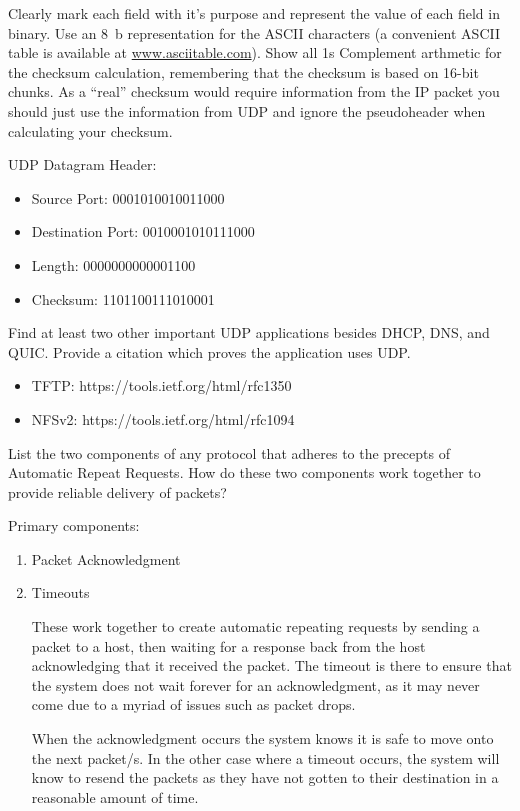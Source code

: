 \documentclass[12pt,addpoints,answers]{exam}
\begin{document}
\begin{questions}
Clearly mark each field with it's purpose and represent the value of each field in binary. Use an \SI{8}{b} representation for the ASCII characters (a convenient ASCII table is available at \url{www.asciitable.com}). Show all 1s Complement arthmetic for the checksum calculation, remembering that the checksum is based on 16-bit chunks. As a ``real'' checksum would require information from the IP packet you should just use the information from UDP and ignore the pseudoheader when calculating your checksum.
\begin{solution}
	UDP Datagram Header:
	\begin{itemize}
		\item Source Port: 0001010010011000
		\item Destination Port: 0010001010111000
		\item Length: 0000000000001100
		\item Checksum: 1101100111010001
	\end{itemize}
\end{solution}

\question[4] Find at least two other important UDP applications besides DHCP, DNS, and QUIC. Provide a citation which proves the application uses UDP.
\begin{solution}
	\begin{itemize}
		\item TFTP:  https://tools.ietf.org/html/rfc1350
		\item NFSv2: https://tools.ietf.org/html/rfc1094
	\end{itemize}
\end{solution}

\question[8] List the two components of any protocol that adheres to the precepts of Automatic Repeat Requests. How do these two components work together to provide reliable delivery of packets?
\begin{solution}
	Primary components:
	\begin{enumerate}
		\item Packet Acknowledgment
		\item Timeouts
		
		These work together to create automatic repeating requests by sending a packet to a host, then waiting for a response back from the host acknowledging that it received the packet.  The timeout is there to ensure that the system does not wait forever for an acknowledgment, as it may never come due to a myriad of issues such as packet drops.
		
		When the acknowledgment occurs the system knows it is safe to move onto the next packet/s.  In the other case where a timeout occurs, the system will know to resend the packets as they have not gotten to their destination in a reasonable amount of time.
	\end{enumerate}
\end{solution}


\end{questions}
\end{document}
